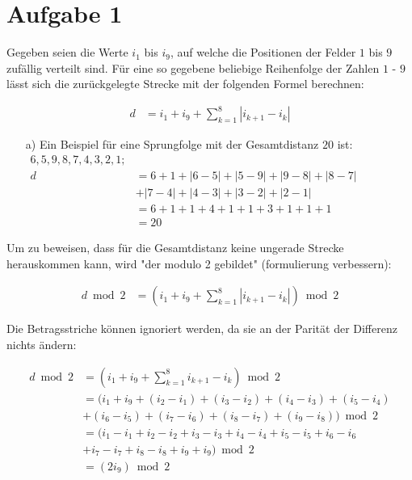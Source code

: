 \documentclass[12pt,a4paper,oneside]{article}
\begin{document}
\pagestyle{fancy}
\fancyfoot[C]{\thepage}

\section[]{Aufgabe 1}

Gegeben seien die Werte $i_1$ bis $i_9$, auf welche die Positionen der Felder $1$ bis $9$ zufällig verteilt sind.
Für eine so gegebene beliebige Reihenfolge der Zahlen $1$ - $9$ lässt sich die zurückgelegte Strecke mit der folgenden Formel berechnen:

\begin{align*}
	d &= i_1 + i_9 + \sum_{k=1}^{8} |i_{k+1} - i_k|
\end{align*}

\begin{itemize}
	\item[a)] Ein Beispiel für eine Sprungfolge mit der Gesamtdistanz $20$ ist: \\
		$\displaystyle\begin{aligned}
		6, 5, 9, 8, 7, 4, 3, 2, 1; \\
			d &= 6 + 1 + |6-5|+|5-9|+|9-8|+|8-7| \\
			&+ |7-4|+|4-3|+|3-2|+|2-1| \\
			&= 6 + 1 + 1 + 4 + 1 + 1 + 3 + 1 + 1 + 1 \\
			&= 20
		\end{aligned}$
\end{itemize}

Um zu beweisen, dass für die Gesamtdistanz keine ungerade Strecke herauskommen kann, wird "der modulo 2 gebildet" (formulierung verbessern):

\begin{align*}
	d \bmod 2 &= \left(i_1 + i_9 + \sum_{k=1}^{8} |i_{k+1} - i_k|\right) \bmod 2
\end{align*}

Die Betragsstriche können ignoriert werden, da sie an der Parität der Differenz nichts ändern:

\begin{align*}
	d \bmod 2 &= \left(i_1 + i_9 + \sum_{k=1}^{8} i_{k+1} - i_k\right) \bmod 2 \\
	&= \biggl(i_1 + i_9 + (i_2 - i_1) + (i_3 - i_2) + (i_4 - i_3) + (i_5 - i_4) \\
	&+ (i_6 - i_5) + (i_7 - i_6) + (i_8 - i_7) + (i_9 - i_8)\biggr) \bmod 2 \\
	&= \biggl(i_1 - i_1 + i_2 - i_2 + i_3 - i_3 + i_4 - i_4 + i_5 - i_5 + i_6 - i_6 \\
	&+ i_7 - i_7 + i_8 - i_8 + i_9 + i_9\biggr) \bmod 2 \\
	&= (2 i_9) \bmod 2
\end{align*}
\end{document}
